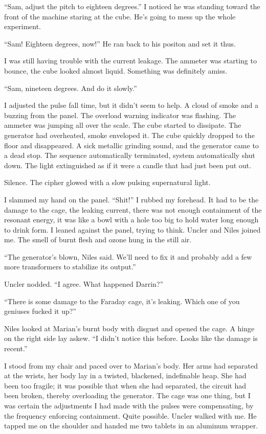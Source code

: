 \documentclass[
]{article}
\begin{document}
``Sam, adjust the pitch to eighteen degrees.'' I noticed he was standing
toward the front of the machine staring at the cube. He's going to mess
up the whole experiment.

``Sam! Eighteen degrees, now!'' He ran back to his positon and set it
thus.

I was still having trouble with the current leakage. The ammeter was
starting to bounce, the cube looked almost liquid. Something was
definitely amiss.

``Sam, nineteen degrees. And do it slowly.''

I adjusted the pulse fall time, but it didn't seem to help. A cloud of
smoke and a buzzing from the panel. The overload warning indicator was
flashing. The ammeter was jumping all over the scale. The cube started
to dissipate. The generator had overheated, smoke enveloped it. The cube
quickly dropped to the floor and disappeared. A sick metallic grinding
sound, and the generator came to a dead stop. The sequence automatically
terminated, system automatically shut down. The light extinguished as if
it were a candle that had just been put out.

Silence. The cipher glowed with a slow pulsing supernatural light.

I slammed my hand on the panel. ``Shit!'' I rubbed my forehead. It had
to be the damage to the cage, the leaking current, there was not enough
containment of the resonant energy, it was like a bowl with a hole too
big to hold water long enough to drink form. I leaned against the panel,
trying to think. Uncler and Niles joined me. The smell of burnt flesh
and ozone hung in the still air.

``The generator's blown, Niles said. We'll need to fix it and probably
add a few more transformers to stabilize its output.''

Uncler nodded. ``I agree. What happened Darrin?''

``There is some damage to the Faraday cage, it's leaking. Which one of
you geniuses fucked it up?''

Niles looked at Marian's burnt body with disgust and opened the cage. A
hinge on the right side lay askew. ``I didn't notice this before. Looks
like the damage is recent.''

I stood from my chair and paced over to Marian's body. Her arms had
separated at the wrists, her body lay in a twisted, blackened,
indefinable heap. She had been too fragile; it was possible that when
she had separated, the circuit had been broken, thereby overloading the
generator. The cage was one thing, but I was certain the adjustments I
had made with the pulses were compensating, by the frequency enforcing
containment. Quite possible. Uncler walked with me. He tapped me on the
shoulder and handed me two tablets in an aluminum wrapper.
\end{document}

